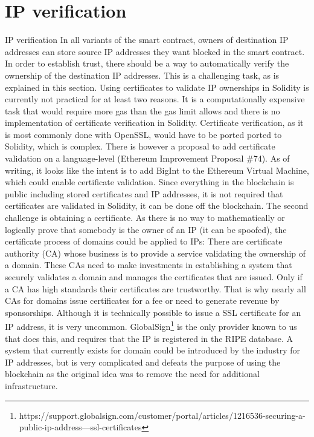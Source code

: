 \section{IP verification}
IP verification
In all variants of the smart contract, owners of destination IP addresses can store source IP addresses they want blocked in the smart contract. In order to establish trust, there should be a way to automatically verify the ownership of the destination IP addresses. This is a challenging task, as is explained in this section. Using certificates to validate IP ownerships in Solidity is currently not practical for at least two reasons.
It is a computationally expensive task that would require more gas than the gas limit allows and there is no implementation of certificate verification in Solidity. Certificate verification, as it is most commonly done with OpenSSL, would have to be ported ported to Solidity, which is complex.
There is however a proposal to add certificate validation on a language-level (Ethereum Improvement Proposal \#74). As of writing, it looks like the intent is to add BigInt to the Ethereum Virtual Machine, which could enable certificate validation.
Since everything in the blockchain is public including stored certificates and IP addresses, it is not required that certificates are validated in Solidity, it can be done off the blockchain.
The second challenge is obtaining a certificate. As there is no way to mathematically or logically prove that somebody is the owner of an IP (it can be spoofed), the certificate process of domains could be applied to IPs: There are certificate authority (CA) whose business is to provide a service validating the ownership of a domain. These CAs need to make investments in establishing a system that securely validates a domain and manages the certificates that are issued. Only if a CA has high standards their certificates are trustworthy. That is why nearly all CAs for domains issue certificates for a fee or need to generate revenue by sponsorships. Although it is technically possible to issue a SSL certificate for an IP address, it is very uncommon. GlobalSign\footnote{https://support.globalsign.com/customer/portal/articles/1216536-securing-a-public-ip-address---ssl-certificates} is the only provider known to us that does this, and requires that the IP is registered in the RIPE database.
A system that currently exists for domain could be introduced by the industry for IP addresses, but is very complicated and defeats the purpose of using the blockchain as the original idea was to remove the need for additional infrastructure.

